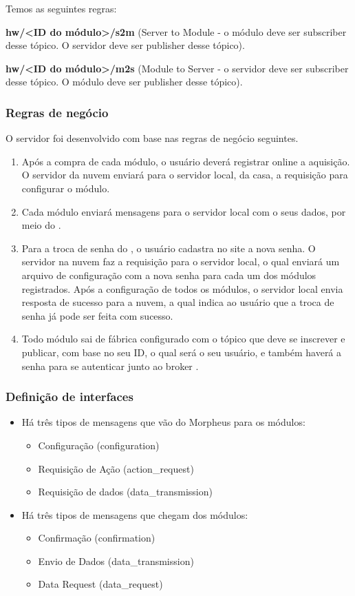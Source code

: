 Temos as seguintes regras:

\textbf{hw/\textless ID do módulo\textgreater /s2m} (Server to Module - o módulo deve ser subscriber desse tópico. O servidor deve ser publisher desse tópico).

\textbf{hw/\textless ID do módulo\textgreater /m2s} (Module to Server - o servidor deve ser subscriber desse tópico. O módulo deve ser publisher desse tópico).

\subsubsection{Regras de negócio}
O servidor foi desenvolvido com base nas regras de negócio seguintes.
\begin{enumerate}
\item Após a compra de cada módulo, o usuário deverá registrar online a aquisição. O servidor da nuvem enviará para o servidor local, da casa, a requisição para configurar o módulo.
\item Cada módulo enviará mensagens para o servidor local com o seus dados, por meio do \wmqtt{}.
\item Para a troca de senha do \wwifi, o usuário cadastra no site a nova senha. O servidor na nuvem faz a requisição para o servidor local, o qual enviará um arquivo de configuração com a nova senha para cada um dos módulos registrados. Após a configuração de todos os módulos, o servidor local envia resposta de sucesso para a nuvem, a qual indica ao usuário que a troca de senha já pode ser feita com sucesso.
\item Todo módulo sai de fábrica configurado com o tópico que deve se inscrever e publicar, com base no seu ID, o qual será o seu usuário, e também haverá a senha para se autenticar junto ao broker \wmqtt{}.
\end{enumerate}

\subsubsection{Definição de interfaces}
\begin{itemize}
\item Há três tipos de mensagens que vão do Morpheus para os módulos:
  \begin{itemize}
  \item Configuração (configuration)
  \item Requisição de Ação (action\_request)
  \item Requisição de dados (data\_transmission)
  \end{itemize}
\item Há três tipos de mensagens que chegam dos módulos:
  \begin{itemize}
  \item Confirmação (confirmation)
  \item Envio de Dados (data\_transmission)
  \item Data Request (data\_request)
  \end{itemize}
\end{itemize}

